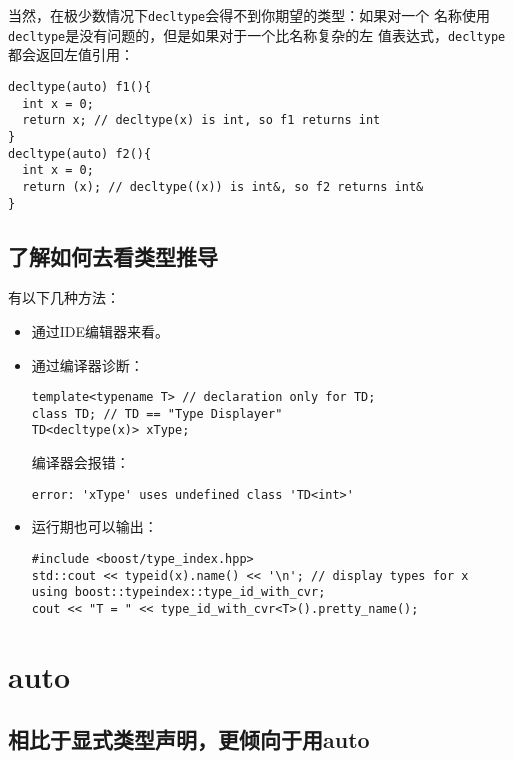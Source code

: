 当然，在极少数情况下\texttt{decltype}会得不到你期望的类型：如果对一个
名称使用\texttt{decltype}是没有问题的，但是如果对于一个比名称复杂的左
值表达式，\texttt{decltype}都会返回左值引用：
\begin{verbatim}
decltype(auto) f1(){
  int x = 0;
  return x; // decltype(x) is int, so f1 returns int
}
decltype(auto) f2(){
  int x = 0;
  return (x); // decltype((x)) is int&, so f2 returns int&
}
\end{verbatim}

\subsection{了解如何去看类型推导}
\label{sec:Item2-4}

有以下几种方法：
\begin{itemize}
\item 通过IDE编辑器来看。
\item 通过编译器诊断：
\begin{verbatim}
template<typename T> // declaration only for TD;
class TD; // TD == "Type Displayer"
TD<decltype(x)> xType;
\end{verbatim}
  编译器会报错：
\begin{verbatim}
error: 'xType' uses undefined class 'TD<int>'
\end{verbatim}
\item 运行期也可以输出：
\begin{verbatim}
#include <boost/type_index.hpp>
std::cout << typeid(x).name() << '\n'; // display types for x
using boost::typeindex::type_id_with_cvr;
cout << "T = " << type_id_with_cvr<T>().pretty_name();
\end{verbatim}
\end{itemize}

\section{auto}

\subsection{相比于显式类型声明，更倾向于用auto}
\label{sec:Item2-5}

